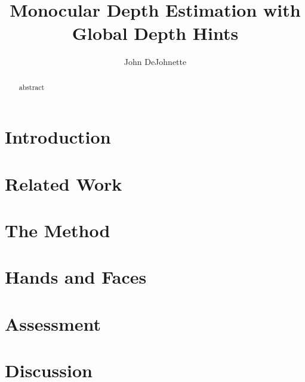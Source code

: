 \documentclass[acmtog,anonymous,timestamp,review]{acmart}
\begin{document}
\title{Monocular Depth Estimation with Global Depth Hints}

\author{John DeJohnette}

\renewcommand{\shortauthors}{DeJohnette, Rowland-Smith, Badeeri, and Foyt}

\begin{abstract}
abstract
\end{abstract}



\maketitle

\section{Introduction}


\section{Related Work}


\section{The Method}


\section{Hands and Faces}


\section{Assessment}


\section{Discussion}




\end{document}
